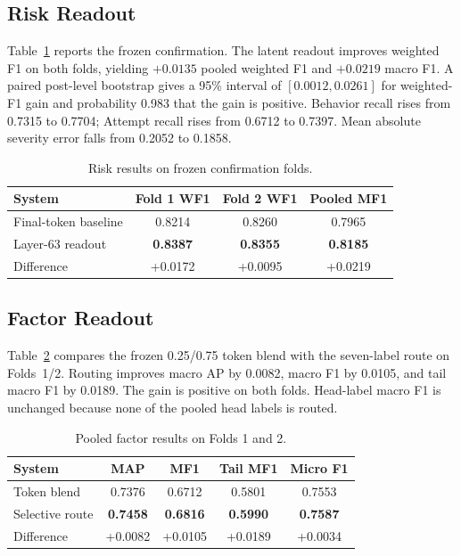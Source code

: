 \documentclass[conference]{IEEEtran}
\begin{document}
\subsection{Risk Readout}
Table~\ref{tab:risk} reports the frozen confirmation. The latent readout improves weighted F1 on both folds, yielding $+0.0135$ pooled weighted F1 and $+0.0219$ macro F1. A paired post-level bootstrap gives a 95\% interval of $[0.0012,0.0261]$ for weighted-F1 gain and probability 0.983 that the gain is positive. Behavior recall rises from 0.7315 to 0.7704; Attempt recall rises from 0.6712 to 0.7397. Mean absolute severity error falls from 0.2052 to 0.1858.

\begin{table}[t]
\caption{Risk results on frozen confirmation folds.}
\label{tab:risk}
\centering
\begin{tabular}{@{}lccc@{}}
\toprule
System & Fold 1 WF1 & Fold 2 WF1 & Pooled MF1 \\
\midrule
Final-token baseline & 0.8214 & 0.8260 & 0.7965 \\
Layer-63 readout & \textbf{0.8387} & \textbf{0.8355} & \textbf{0.8185} \\
\midrule
Difference & +0.0172 & +0.0095 & +0.0219 \\
\bottomrule
\end{tabular}
\end{table}

\subsection{Factor Readout}
Table~\ref{tab:factor} compares the frozen 0.25/0.75 token blend with the seven-label route on Folds~1/2. Routing improves macro AP by 0.0082, macro F1 by 0.0105, and tail macro F1 by 0.0189. The gain is positive on both folds. Head-label macro F1 is unchanged because none of the pooled head labels is routed.

\begin{table}[t]
\caption{Pooled factor results on Folds 1 and 2.}
\label{tab:factor}
\centering
\begin{tabular}{lcccc}
\toprule
System & MAP & MF1 & Tail MF1 & Micro F1 \\
\midrule
Token blend & 0.7376 & 0.6712 & 0.5801 & 0.7553 \\
Selective route & \textbf{0.7458} & \textbf{0.6816} & \textbf{0.5990} & \textbf{0.7587} \\
\midrule
Difference & +0.0082 & +0.0105 & +0.0189 & +0.0034 \\
\bottomrule
\end{tabular}
\end{table}
\end{document}
